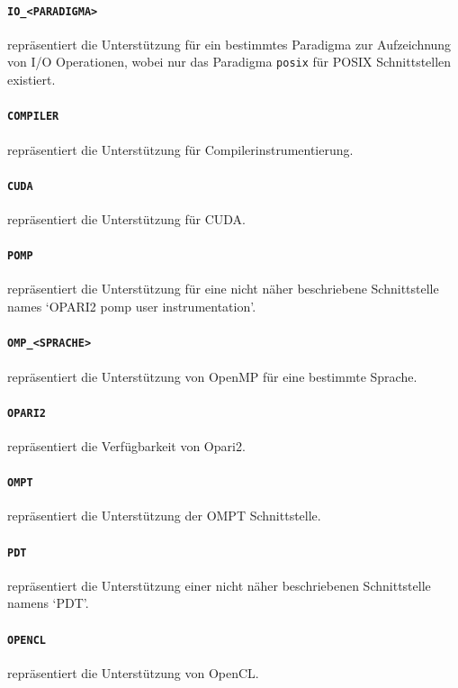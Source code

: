 \documentclass[german,proseminar,hyperref,utf8,lof]{zihpub}
\begin{document}
    \paragraph{\texttt{IO\_<PARADIGMA>}} repräsentiert die Unterstützung für ein bestimmtes Paradigma zur
    Aufzeichnung von I/O Operationen, wobei nur das Paradigma \texttt{posix} für POSIX Schnittstellen existiert.

    \paragraph{\texttt{COMPILER}} repräsentiert die Unterstützung für Compilerinstrumentierung.

    \paragraph{\texttt{CUDA}} repräsentiert die Unterstützung für CUDA.
    
    \paragraph{\texttt{POMP}} repräsentiert die Unterstützung für eine nicht näher beschriebene Schnittstelle
    names `OPARI2 pomp user instrumentation'.

    \paragraph{\texttt{OMP\_<SPRACHE>}} repräsentiert die Unterstützung von OpenMP für eine bestimmte Sprache.

    \paragraph{\texttt{OPARI2}} repräsentiert die Verfügbarkeit von Opari2.

    \paragraph{\texttt{OMPT}} repräsentiert die Unterstützung der OMPT Schnittstelle.

    \paragraph{\texttt{PDT}} repräsentiert die Unterstützung einer nicht näher beschriebenen Schnittstelle
    namens `PDT'.

    \paragraph{\texttt{OPENCL}} repräsentiert die Unterstützung von OpenCL.
\end{document}
